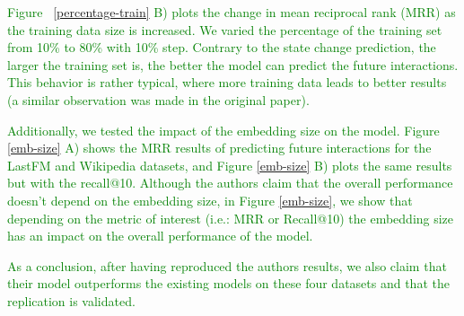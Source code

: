 \textcolor{green}{Figure ~\ref{percentage-train} B) plots the change in mean
reciprocal rank (MRR) as the training data size is increased. We varied the percentage of the training set from 10\% to 80\% with 10\% step. Contrary to the state change prediction, the larger the training set is, the better the model can predict the future interactions. This behavior is rather typical, where more training data leads to better results (a similar observation was made in the original paper). }


\textcolor{green}{Additionally, we tested the impact of the embedding size on the model. Figure \ref{emb-size} A)  shows the MRR results of predicting future interactions for the  LastFM and Wikipedia datasets, and  Figure \ref{emb-size} B) plots the same results but with the recall@10. Although the authors claim that the overall performance doesn't depend on the embedding size, in Figure \ref{emb-size},  we show that depending on the metric of interest (i.e.: MRR or Recall@10) the embedding size has an impact on the overall performance of the model. }


\textcolor{green}{As a conclusion, after having reproduced the authors results, we also claim that their model outperforms the existing models on these four datasets and that the replication is validated.}

